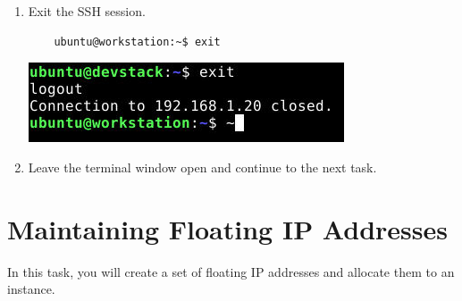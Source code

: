 \documentclass[letterpaper, 12pt]{article}
\begin{document}
\begin{enumerate}
    \item Exit the SSH session.
    \begin{lstlisting}
    ubuntu@workstation:~$ exit
    \end{lstlisting}

    \begin{center}
        \includegraphics[width=\linewidth]{images/part2/step19.png}
    \end{center}

    \item Leave the terminal window open and continue to the next task.

\end{enumerate}

\section{Maintaining Floating IP Addresses}
\label{sec:maintaining_floating_ip_addresses}
In this task, you will create a set of floating IP addresses and allocate them to an instance.
\end{document}
